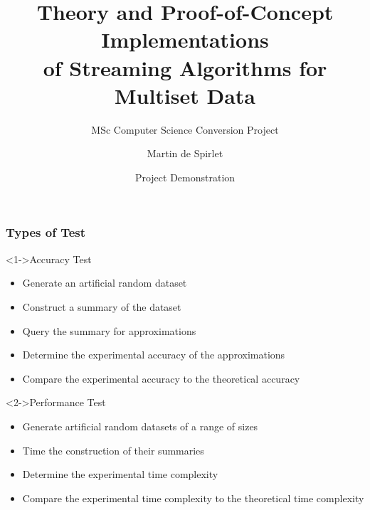 \documentclass{beamer}
\title[Streaming Algorithms]{Theory and Proof-of-Concept Implementations \\ of Streaming Algorithms for Multiset Data}
\subtitle{MSc Computer Science Conversion Project}
\author{Martin de Spirlet}
\institute[]{University of Birmingham}
\date{Project Demonstration}
\begin{document}
\begin{frame}
  \titlepage
\end{frame}

\begin{frame}
  \frametitle{Types of Test}

  \begin{block}<1->{Accuracy Test}
    \begin{itemize}
      \item Generate an artificial random dataset
      \item Construct a summary of the dataset
      \item Query the summary for approximations
      \item Determine the experimental accuracy of the approximations
      \item Compare the experimental accuracy to the theoretical accuracy
    \end{itemize}
  \end{block}

  \begin{block}<2->{Performance Test}
    \begin{itemize}
      \item Generate artificial random datasets of a range of sizes
      \item Time the construction of their summaries
      \item Determine the experimental time complexity
      \item Compare the experimental time complexity to the theoretical time complexity
    \end{itemize}
  \end{block}
\end{frame}
\end{document}
